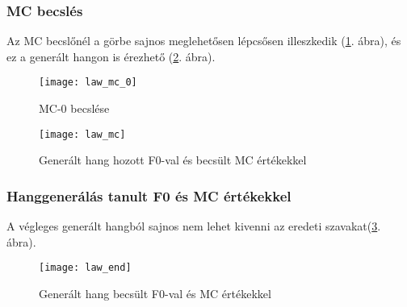\clearpage
\subsubsection{MC becslés}
Az MC becslőnél a görbe sajnos meglehetősen lépcsősen illeszkedik (\ref{law-6}. ábra), és ez a generált hangon is érezhető (\ref{law-7}. ábra).
\begin{figure}[h]
	\par\centering	
	\texttt{[image: law\_mc\_0]}
	\caption{MC-0 becslése}
	\label{law-6}
\end{figure}
\begin{figure}[h]
	\par\centering	
	\texttt{[image: law\_mc]}
	\caption{Generált hang hozott F0-val és becsült MC értékekkel}
	\label{law-7}
\end{figure}
\subsubsection{Hanggenerálás tanult F0 és MC értékekkel}
A végleges generált hangból sajnos nem lehet kivenni az eredeti szavakat(\ref{law-8}. ábra).
\begin{figure}[h]
	\par\centering	
	\texttt{[image: law\_end]}
	\caption{Generált hang becsült F0-val és MC értékekkel}
	\label{law-8}
\end{figure}